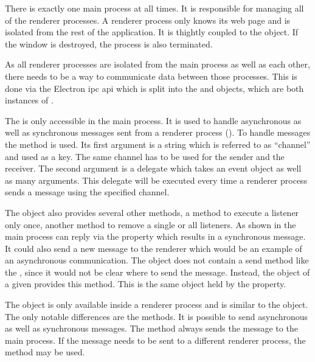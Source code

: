 There is exactly one main process at all times. It is responsible for managing all of the renderer processes. A renderer process only knows its web page and is isolated from the rest of the application. It is thightly coupled to the  object. If the window is destroyed, the process is also terminated.


As all renderer processes are isolated from the main process as well as each other, there needs to be a way to communicate data between those processes. This is done via the Electron \gls{ipc} \gls{api} which is split into the  and  objects, which are both instances of .


The  is only accessible in the main process. It is used to handle asynchronous as well as synchronous messages sent from a renderer process (). To handle messages the  method is used. Its first argument is a string which is referred to as \enquote{channel} and used as a key. The same channel has to be used for the sender and the receiver. The second argument is a delegate which takes an event object as well as many arguments. This delegate will be executed every time a renderer process sends a message using the specified channel.

The  object also provides several other methods, \zB a method to execute a listener only once, another method to remove a single or all listeners. As shown in  the main process can reply via the  property which results in a synchronous message. It could also send a new message to the renderer which would be an example of an asynchronous communication. The  object does not contain a send method like the , since it would not be clear where to send the message. Instead, the  object of a given  provides this method. This is the same object held by the  property. \cite{ipcMain}

The  object is only available inside a renderer process and is similar to the  object. The only notable differences are the  methods. It is possible to send asynchronous as well as synchronous messages. The  method always sends the message to the main process. If the message needs to be sent to a different renderer process, the  method may be used. \cite{ipcRenderer}

